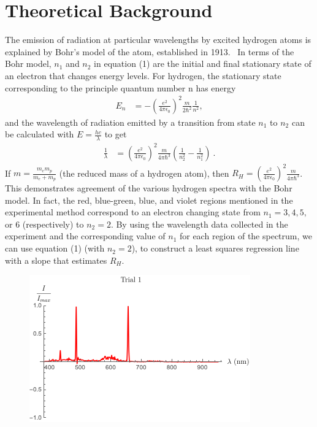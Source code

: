 \documentclass[aps,prl,preprint,groupedaddress]{revtex4-2}
\begin{document}
\section{Theoretical Background}
The emission of radiation at particular wavelengths by excited hydrogen atoms is explained by Bohr's model of the atom, established in 1913.~\cite{krane} In terms of the Bohr model, $n_1$ and $n_2$ in equation (1) are the initial and final stationary state of an electron that changes energy levels. For hydrogen, the stationary state corresponding to the principle quantum number n has energy 
\begin{align}
    E_n &= -(\frac{e^2}{4 \pi \epsilon_0})^2 \frac{m}{2\hbar^2} \frac{1}{n^2},
\end{align}
and the wavelength of radiation emitted by a transition from state $n_1$ to $n_2$  can be calculated with $E = \frac{hc}{\lambda}$ to get
\begin{align}
    \frac{1}{\lambda}&=(\frac{e^2}{4 \pi \epsilon_0})^{2}\frac{m}{4\pi\hbar^3}(\frac{1}{n_2^2}-\frac{1}{n_1^2})~.
\end{align}
If $m=\frac{m_e m_p}{m_e + m_p}$ (the reduced mass of a hydrogen atom), then $R_H = (\frac{e^2}{4 \pi \epsilon_0})^{2}\frac{m}{4\pi\hbar^3}$. This demonstrates agreement of the various hydrogen spectra with the Bohr model. In fact, the red, blue-green, blue, and violet regions mentioned in the experimental method correspond to an electron changing state from $n_1 = 3, 4, 5,$ or $6$ (respectively) to $n_2 = 2$. By using the wavelength data collected in the experiment and the corresponding value of $n_1$ for each region of the spectrum, we can use equation (1) (with $n_2=2$), to construct a least squares regression line with a slope that estimates $R_H$.

    \begin{figure}[h]
        \centering
		\includegraphics{trial1.png}
		\caption{}
    \end{figure}
    
\end{document}

